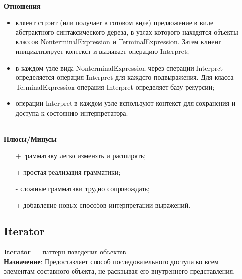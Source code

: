 \documentclass[a3paper,11pt]{report}
\begin{document}
\textbf{\\Отношения}
\begin{itemize}
\item клиент строит (или получает в готовом виде) предложение в виде абстрактного синтаксического дерева, в узлах которого находятся объекты классов NonterminalExpression и TerminalExpression. Затем клиент инициализирует контекст и вызывает операцию Interpret;
\item в каждом узле вида NonterminalExpression через операции Interpret определяется операция Interpret для каждого подвыражения. Для класса TerminalExpression операция Interpret определяет базу рекурсии;
\item операции Interpret в каждом узле используют контекст для сохранения и доступа к состоянию интерпретатора.
\end{itemize}

\textbf{\\Плюсы/Минусы}
\begin{itemize}
\item [+] грамматику легко изменять и расширять;
\item [+] простая реализация грамматики;
\item [-] сложные грамматики трудно сопровождать;
\item [+] добавление новых способов интерпретации выражений.
\end{itemize}

\newpage
\subsection{Iterator}

\large\textbf{Iterator} --- паттерн поведения объектов.
\\
\large\textbf{Назначение}: Предоставляет способ последовательного доступа ко всем элементам составного объекта, не раскрывая его внутреннего представления.
\\
\end{document}
